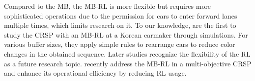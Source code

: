 \documentclass[12pt]{article}
\begin{document}



Compared to the MB, the MB-RL is more flexible but requires more sophisticated operations due to the permission for cars to enter forward lanes multiple times, which limits research on it. To our knowledge, \citet{moon2005simulation} are the first to study the CRSP with an MB-RL at a Korean carmaker through simulations. For various buffer sizes, they apply simple rules to rearrange cars to reduce color changes in the obtained sequence. Later studies \citep{boysen2012resequencing, bysko2020automotive} recognize the flexibility of the RL as a future research topic. \citet{yu2023analysis} recently address the MB-RL in a multi-objective CRSP and enhance its operational efficiency by reducing RL usage.
\end{document}

